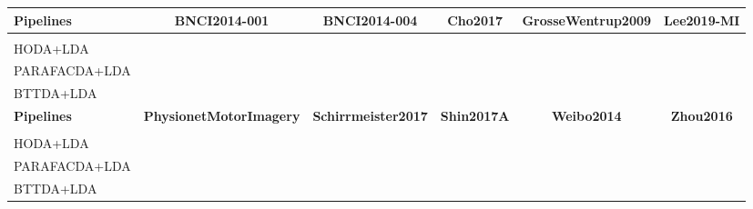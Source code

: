 \begin{tabularx}{\textwidth}{@{}Xccccc@{}}
\toprule
\textbf{Pipelines}            & \textbf{BNCI2014-001} & \textbf{BNCI2014-004}
                              & \textbf{Cho2017} & \textbf{GrosseWentrup2009} &
                              \textbf{Lee2019-MI}\\
\midrule
                  &  & & & & \\ \midrule
HODA+LDA                  & & & & &  \\
PARAFACDA+LDA             & & & & &  \\
BTTDA+LDA                 & & & & &  \\
\toprule
\textbf{Pipelines} & \textbf{PhysionetMotorImagery} & \textbf{Schirrmeister2017} &
\textbf{Shin2017A} &
\textbf{Weibo2014} & \textbf{Zhou2016}\\
\midrule
                  & & & & & \\ \midrule
HODA+LDA                  & & & & &  \\
PARAFACDA+LDA             & & & & &  \\
BTTDA+LDA                 & & & & &  \\
\bottomrule
\end{tabularx}
